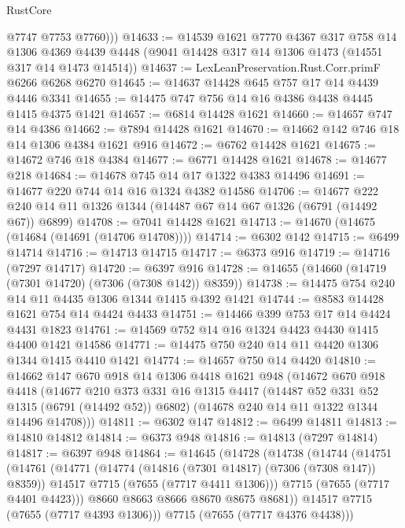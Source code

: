 \begin{lexlean}{RustCore}
\begin{coremodule}
          @7747
          @7753
          @7760)))
@14633 := @14539
    @1621
    @7770
    @4367
    @317
    @758
    @14
    @1306
    @4369
    @4439
    @4448
    (@9041 @14428 @317 @14 @1306 @1473 (@14551 @317 @14 @1473 @14514))
@14637 := LexLeanPreservation.Rust.Corr.primF @6266 @6268 @6270
@14645 := @14637 @14428 @645 @757 @17 @14 @4439 @4446 @3341
@14655 := @14475 @747 @756 @14 @16 @4386 @4438 @4445 @1415 @4375 @1421
@14657 := @6814 @14428 @1621
@14660 := @14657 @747 @14 @4386
@14662 := @7894 @14428 @1621
@14670 := @14662 @142 @746 @18 @14 @1306 @4384 @1621 @916
@14672 := @6762 @14428 @1621
@14675 := @14672 @746 @18 @4384
@14677 := @6771 @14428 @1621
@14678 := @14677 @218
@14684 := @14678 @745 @14 @17 @1322 @4383 @14496
@14691 := @14677 @220 @744 @14 @16 @1324 @4382 @14586
@14706 := @14677 @222 @240 @14 @11 @1326 @1344 (@14487 @67 @14 @67 @1326 (@6791 (@14492 @67)) @6899)
@14708 := @7041 @14428 @1621
@14713 := @14670 (@14675 (@14684 (@14691 (@14706 @14708))))
@14714 := @6302 @142
@14715 := @6499 @14714
@14716 := @14713 @14715
@14717 := @6373 @916
@14719 := @14716 (@7297 @14717)
@14720 := @6397 @916
@14728 := @14655 (@14660 (@14719 (@7301 @14720) (@7306 (@7308 @142)) @8359))
@14738 := @14475 @754 @240 @14 @11 @4435 @1306 @1344 @1415 @4392 @1421
@14744 := @8583 @14428 @1621 @754 @14 @4424 @4433
@14751 := @14466 @399 @753 @17 @14 @4424 @4431 @1823
@14761 := @14569 @752 @14 @16 @1324 @4423 @4430 @1415 @4400 @1421 @14586
@14771 := @14475 @750 @240 @14 @11 @4420 @1306 @1344 @1415 @4410 @1421
@14774 := @14657 @750 @14 @4420
@14810 := @14662
    @147
    @670
    @918
    @14
    @1306
    @4418
    @1621
    @948
    (@14672
      @670
      @918
      @4418
      (@14677
        @210
        @373
        @331
        @16
        @1315
        @4417
        (@14487 @52 @331 @52 @1315 (@6791 (@14492 @52)) @6802)
        (@14678 @240 @14 @11 @1322 @1344 @14496 @14708)))
@14811 := @6302 @147
@14812 := @6499 @14811
@14813 := @14810 @14812
@14814 := @6373 @948
@14816 := @14813 (@7297 @14814)
@14817 := @6397 @948
@14864 := @14645
    (@14728
      (@14738
        (@14744
          (@14751
            (@14761
              (@14771
                (@14774 (@14816 (@7301 @14817) (@7306 (@7308 @147)) @8359))
                @14517
                @7715
                (@7655 (@7717 @4411 @1306)))
              @7715
              (@7655 (@7717 @4401 @4423)))
            @8660
            @8663
            @8666
            @8670
            @8675
            @8681))
        @14517
        @7715
        (@7655 (@7717 @4393 @1306)))
      @7715
      (@7655 (@7717 @4376 @4438)))

\end{coremodule}
\end{lexlean}
